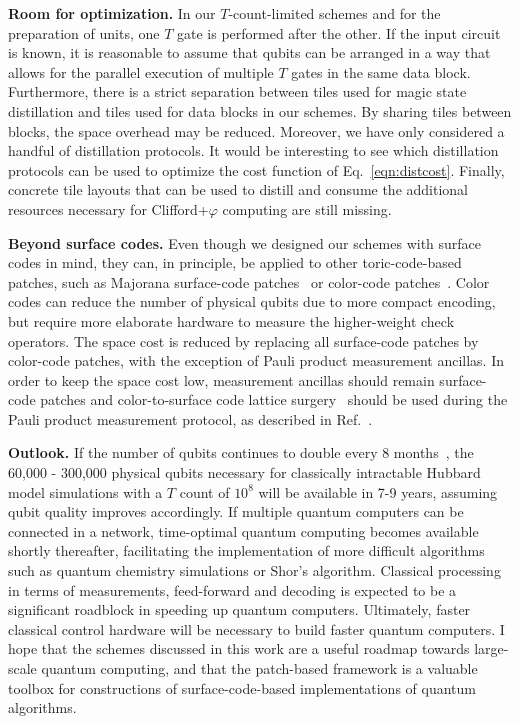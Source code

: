 \documentclass[prx,aps,letterpaper,twocolumn,allowfontchageintitle=true,accepted=2019-02-01]{quantumarticle}
\begin{document}
\textbf{Room for optimization.} In our $T$-count-limited schemes and for the preparation of units, one $T$ gate is performed after the other. If the input circuit is known, it is reasonable to assume that qubits can be arranged in a way that allows for the parallel execution of multiple $T$ gates in the same data block. Furthermore, there is a strict separation between tiles used for magic state distillation and tiles used for data blocks in our schemes. By sharing tiles between blocks, the space overhead may be reduced. Moreover, we have only considered a handful of distillation protocols. It would be interesting to see which distillation protocols can be used to optimize the cost function of Eq.~\eqref{eqn:distcost}. Finally, concrete tile layouts that can be used to distill and consume the additional resources necessary for Clifford+$\varphi$ computing are still missing.



\textbf{Beyond surface codes.} Even though we designed our schemes with surface codes in mind, they can, in principle, be applied to other toric-code-based patches, such as Majorana surface-code patches~\cite{Litinski2017b} or color-code patches~\cite{Bombin2006,Landahl2014,Kesselring2018}. Color codes can reduce the number of physical qubits due to more compact encoding, but require more elaborate hardware to measure the higher-weight check operators. The space cost is reduced by replacing all surface-code patches by color-code patches, with the exception of Pauli product measurement ancillas. In order to keep the space cost low, measurement ancillas should remain surface-code patches and color-to-surface code lattice surgery~\cite{Nautrup2016} should be used during the Pauli product measurement protocol, as described in Ref.~\cite{Litinski2017a}.



\textbf{Outlook.}
If the number of qubits continues to double every 8 months~\cite{QubitDouble}, the
60,000 - 300,000 physical qubits necessary for classically intractable Hubbard model simulations with a $T$ count of $10^8$ will be available in 7-9 years, assuming qubit quality improves accordingly. If multiple quantum computers can be connected in a network, time-optimal quantum computing becomes available shortly thereafter, facilitating the implementation of more difficult algorithms such as quantum chemistry simulations or Shor's algorithm. Classical processing in terms of measurements, feed-forward and decoding is expected to be a significant roadblock in speeding up quantum computers. Ultimately, faster classical control hardware will be necessary to build faster quantum computers. I hope that the schemes discussed in this work are a useful roadmap towards large-scale quantum computing, and that the patch-based framework is a valuable toolbox for constructions of surface-code-based implementations of quantum algorithms.
\end{document}
